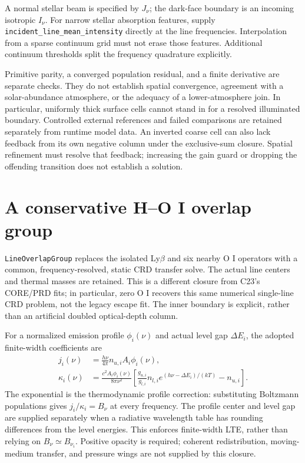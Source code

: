 \documentclass[10pt,a4paper]{article}
\begin{document}
A normal stellar beam is specified by $J_\nu$; the dark-face boundary is an
incoming isotropic $I_\nu$. For narrow stellar absorption features, supply
\texttt{incident\_line\_mean\_intensity} directly at the line frequencies.
Interpolation from a sparse continuum grid must not erase those features.
Additional continuum thresholds split the frequency quadrature explicitly.

Primitive parity, a converged population residual, and a finite derivative
are separate checks. They do not establish spatial convergence, agreement
with a solar-abundance atmosphere, or the adequacy of a lower-atmosphere join.
In particular, uniformly thick surface cells cannot stand in for a resolved
illuminated boundary. Controlled external references and failed comparisons
are retained separately from runtime model data.
An inverted coarse cell can also lack feedback from its own negative column
under the exclusive-sum closure. Spatial refinement must resolve that
feedback; increasing the gain guard or dropping the offending transition
does not establish a solution.

\section{A conservative H--O I overlap group}
\texttt{LineOverlapGroup} replaces the isolated Ly$\beta$ and six nearby
O I operators with a common, frequency-resolved, static CRD transfer solve.
The actual line centers and thermal masses are retained. This is a different
closure from C23's CORE/PRD fits; in particular, zero O I recovers this same
numerical single-line CRD problem, not the legacy escape fit. The inner
boundary is explicit, rather than an artificial doubled optical-depth column.

For a normalized emission profile $\phi_i(\nu)$ and actual level gap $\Delta E_i$,
the adopted finite-width coefficients are
\begin{align}
 j_i(\nu)&=\frac{h\nu}{4\pi}n_{u,i}A_i\phi_i(\nu),\\
 \kappa_i(\nu)&=\frac{c^2 A_i\phi_i(\nu)}{8\pi\nu^2}
 \left[\frac{g_{u,i}}{g_{l,i}}n_{l,i}
 e^{(h\nu-\Delta E_i)/(kT)}-n_{u,i}\right].
\end{align}
The exponential is the thermodynamic profile correction: substituting
Boltzmann populations gives $j_i/\kappa_i=B_\nu$ at every frequency.
The profile center and level gap are supplied separately when a radiative
wavelength table has rounding differences from the level energies.
This enforces finite-width LTE, rather than relying on $B_\nu\simeq B_{\nu_i}$.
Positive opacity is required; coherent redistribution, moving-medium transfer,
and pressure wings are not supplied by this closure.
\end{document}
